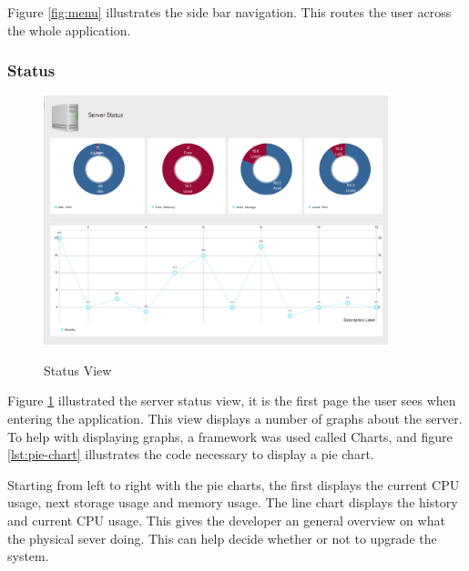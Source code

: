 

Figure \ref{fig:menu} illustrates the side bar navigation. This routes the user across the whole application.

\subsubsection{Status}

\begin{figure}[!h]
    \caption{Status View}
    \centering
    \includegraphics[width=100mm]{images/dashboard/status}
    \label{fig:status-view}
\end{figure}

Figure \ref{fig:status-view} illustrated the server status view, it is the first page the user sees when entering the application. This view displays a number of graphs about the server. To help with displaying graphs, a framework was used called Charts, and figure \ref{lst:pie-chart} illustrates the code necessary to display a pie chart. 

Starting from left to right with the pie charts, the first displays the current CPU usage, next storage usage and memory usage. The line chart displays the history and current CPU usage. This gives the developer an general overview on what the physical sever doing. This can help decide whether or not to upgrade the system.

